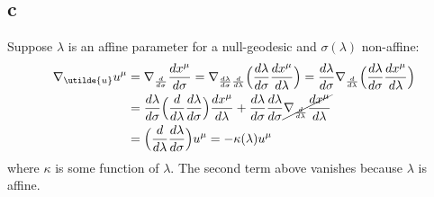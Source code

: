 \documentclass{article}
\begin{document}
\subsection*{c}
Suppose $\lambda$ is an affine parameter for a null-geodesic and $\sigma(\lambda)$ non-affine:
\begin{align*}
 \nabla_{\utilde{u}}u^\mu &= \nabla_{\frac{d}{d\sigma}}\frac{dx^\mu}{d\sigma} 
	= \nabla_{\frac{d\lambda}{d\sigma}\frac{d}{d\lambda}}\Big(\frac{d\lambda}{d\sigma}\frac{dx^\mu}{d\lambda}\Big)
	= \frac{d\lambda}{d\sigma} \nabla_{\frac{d}{d\lambda}}\Big(\frac{d\lambda}{d\sigma}\frac{dx^\mu}{d\lambda}\Big) \\
	&= \frac{d\lambda}{d\sigma} \Big(\frac{d}{d\lambda}\frac{d\lambda}{d\sigma} \Big)\frac{dx^\mu}{d\lambda}
	+ \frac{d\lambda}{d\sigma}\frac{d\lambda}{d\sigma} \cancel{\nabla_{\frac{d}{d\lambda}}\frac{dx^\mu}{d\lambda}} \\
	&= \Big(\frac{d}{d\lambda}\frac{d\lambda}{d\sigma}\Big) u^\mu = - \kappa(\lambda) u^\mu
\end{align*}
where $\kappa$ is some function of $\lambda$. The second term above vanishes because $\lambda$ is affine.
\end{document}
